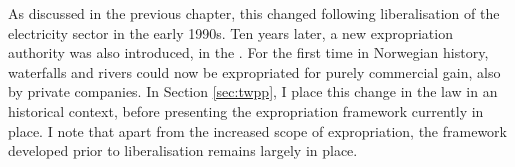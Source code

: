 %
%

As discussed in the previous chapter, this changed following liberalisation of the electricity sector in the early 1990s. Ten years later, a new  expropriation authority was also introduced, in the \cite{wra00}. For the first time in Norwegian history, waterfalls and rivers could now be expropriated for purely commercial gain, also by private companies. In Section \ref{sec:twpp}, I place this change in the law in an historical context, before presenting the expropriation framework currently in place. I note that apart from the increased scope of expropriation, the framework developed prior to liberalisation remains largely in place.


